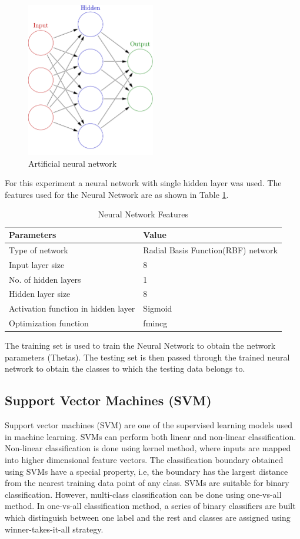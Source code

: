 \documentclass[11pt]{article}
\begin{document}
		\begin{figure}[H]
			\centering
			\includegraphics[width=0.5\textwidth]{NN.png}
			\caption{Artificial neural network}
			\label{NN}
		\end{figure}
		
		For this experiment a neural network with single hidden layer was used. The features used for the Neural Network are as shown in Table \ref{NN_features}.
		\begin{table}[h!]
			\centering
			\caption{Neural Network Features}
			\label{NN_features}
			\begin{tabular}{l l}
				\hline
				Parameters &Value\\\hline
				Type of network &Radial Basis Function(RBF) network\\
				Input layer size &8\\
				No. of hidden layers &1\\
				Hidden layer size &8\\
				Activation function in hidden layer &Sigmoid\\
				Optimization function &fmincg\\
			\end{tabular}
		\end{table}
		The training set is used to train the Neural Network to obtain the network parameters (Thetas). The testing set is then passed through the trained neural network to obtain the classes to which the testing data belongs to.
	\subsection{Support Vector Machines (SVM)}
		Support vector machines (SVM) are one of the supervised learning models used in machine learning. SVMs can perform both linear and non-linear classification. Non-linear classification is done using kernel method, where inputs are mapped into higher dimensional feature vectors. The classification boundary obtained using SVMs have a special property, i.e, the boundary has the largest distance from the nearest training data point of any class. SVMs are suitable for binary classification. However, multi-class classification can be done using one-vs-all method. In one-vs-all classification method, a series of binary classifiers are built which distinguish between one label and the rest and classes are assigned using winner-takes-it-all strategy.
		
\end{document}
